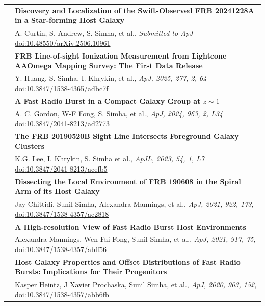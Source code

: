 \documentclass[letterpaper, 11pt]{article}
\begin{document}
\begin{longtable}{p{1.3in}p{4.8in}}
& \textbf{Discovery and Localization of the Swift-Observed FRB 20241228A in a Star-forming Host Galaxy}\\
& A. Curtin, S. Andrew, S. Simha, et al., \textit{Submitted to ApJ} \href{https://ui.adsabs.harvard.edu/link_gateway/2025arXiv250610961C/doi:10.48550/arXiv.2506.10961}{doi:10.48550/arXiv.2506.10961}\\

& \textbf{FRB Line-of-sight Ionization Measurement from Lightcone AAOmega Mapping Survey: The First Data Release}\\
& Y. Huang, S. Simha, I. Khrykin, et al., \textit{ApJ, 2025, 277, 2, 64} \href{https://ui.adsabs.harvard.edu/link_gateway/2025ApJS..277...64H/doi:10.3847/1538-4365/adbc7f}{doi:10.3847/1538-4365/adbc7f}\\

& \textbf{A Fast Radio Burst in a Compact Galaxy Group at $z\sim1$}\\
& A. C. Gordon, W-F Fong, S. Simha, et al., \textit{ApJ, 2024, 963, 2, L34} \href{https://ui.adsabs.harvard.edu/link_gateway/2024ApJ...963L..34G/doi:10.3847/2041-8213/ad2773}{doi:10.3847/2041-8213/ad2773}\\


& \textbf{The FRB 20190520B Sight Line Intersects Foreground Galaxy Clusters}\\
& K.G. Lee, I. Khrykin, S. Simha et al., \textit{ApJL, 2023, 54, 1, L7} \href{https://ui.adsabs.harvard.edu/link_gateway/2023ApJ...954L...7L/doi:10.3847/2041-8213/acefb5}{doi:10.3847/2041-8213/acefb5}\\

& \textbf{Dissecting the Local Environment of FRB 190608 in the Spiral Arm of its Host Galaxy } \\

& Jay Chittidi, Sunil Simha, Alexandra Mannings, et al.,  \textit{ApJ, 2021, 922, 173}, \href{https://ui.adsabs.harvard.edu/link_gateway/2021ApJ...922..173C/doi:10.3847/1538-4357/ac2818}{doi:10.3847/1538-4357/ac2818} \\

& \textbf{A High-resolution View of Fast Radio Burst Host Environments } \\
& Alexandra Mannings, Wen-Fai Fong, Sunil Simha, et al., \textit{ApJ, 2021, 917, 75}, \href{https://ui.adsabs.harvard.edu/link_gateway/2021ApJ...917...75M/doi:10.3847/1538-4357/abff56}{doi:10.3847/1538-4357/abff56} \\

& \textbf{Host Galaxy Properties and Offset Distributions of Fast Radio Bursts: Implications for Their Progenitors } \\
& Kasper Heintz, J Xavier Prochaska, Sunil Simha, et al., \textit{ApJ, 2020, 903, 152}, \href{https://ui.adsabs.harvard.edu/link_gateway/2020ApJ...903..152H/doi:10.3847/1538-4357/abb6fb}{doi:10.3847/1538-4357/abb6fb}\\


\end{longtable}
\end{document}
